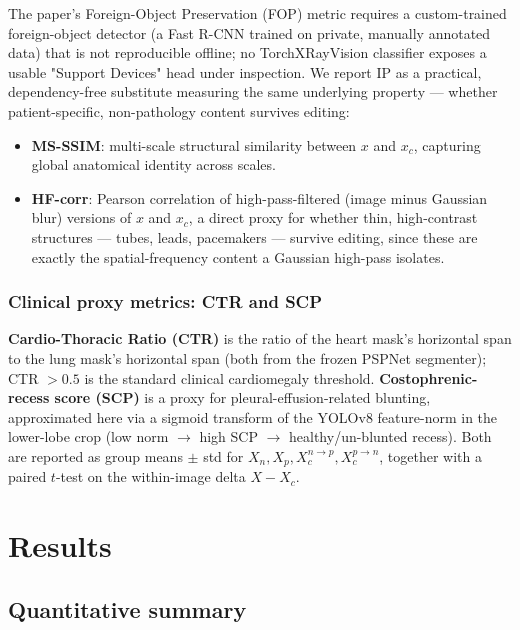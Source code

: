 \documentclass[11pt]{article}
\begin{document}
The paper's Foreign-Object Preservation (FOP) metric requires a
custom-trained foreign-object detector (a Fast R-CNN trained on private,
manually annotated data) that is not reproducible offline; no
TorchXRayVision classifier exposes a usable "Support Devices" head under
inspection. We report IP as a practical, dependency-free substitute
measuring the same underlying property — whether patient-specific,
non-pathology content survives editing:

\begin{itemize}[leftmargin=*]
  \item \textbf{MS-SSIM}: multi-scale structural similarity between $x$
        and $x_c$, capturing global anatomical identity across scales.
  \item \textbf{HF-corr}: Pearson correlation of high-pass-filtered
        (image minus Gaussian blur) versions of $x$ and $x_c$, a direct
        proxy for whether thin, high-contrast structures — tubes, leads,
        pacemakers — survive editing, since these are exactly the
        spatial-frequency content a Gaussian high-pass isolates.
\end{itemize}

\subsubsection{Clinical proxy metrics: CTR and SCP}

\textbf{Cardio-Thoracic Ratio (CTR)} is the ratio of the heart mask's
horizontal span to the lung mask's horizontal span (both from the frozen
PSPNet segmenter); CTR $> 0.5$ is the standard clinical cardiomegaly
threshold. \textbf{Costophrenic-recess score (SCP)} is a proxy for
pleural-effusion-related blunting, approximated here via a sigmoid
transform of the YOLOv8 feature-norm in the lower-lobe crop (low norm
$\to$ high SCP $\to$ healthy/un-blunted recess). Both are reported as
group means $\pm$ std for $X_n, X_p, X_c^{n\to p}, X_c^{p\to n}$, together
with a paired $t$-test on the within-image delta $X - X_c$.

\section{Results}

\subsection{Quantitative summary}
\end{document}
